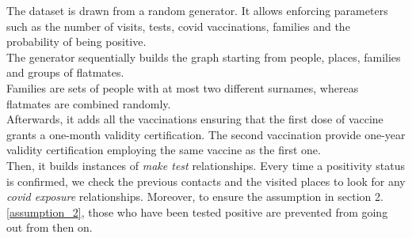 \label{section: 4}
The dataset is drawn from a random generator. It allows enforcing parameters such as the number of visits, tests, covid vaccinations, families and the probability of being positive. \\
The generator sequentially builds the graph starting from people, places, families and groups of flatmates. \\
Families are sets of people with at most two different surnames, whereas flatmates are combined randomly. \\
Afterwards, it adds all the vaccinations ensuring that the first dose of vaccine grants a one-month validity certification. The second vaccination provide one-year validity certification employing the same vaccine as the first one. \\
Then, it builds instances of \textit{make test} relationships. 
Every time a positivity status is confirmed, we check the previous contacts and the visited places to look for any \textit{covid exposure} relationships. Moreover,  to ensure the assumption in section 2.\ref{assumption_2}, those who have been tested positive are prevented from going out from then on.